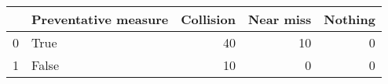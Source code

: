 \begin{tabular}{llrrr}
\toprule
{} &  Preventative measure &  Collision &  Near miss &  Nothing \\
\midrule
0 &                  True &         40 &         10 &        0 \\
1 &                 False &         10 &          0 &        0 \\
\bottomrule
\end{tabular}
